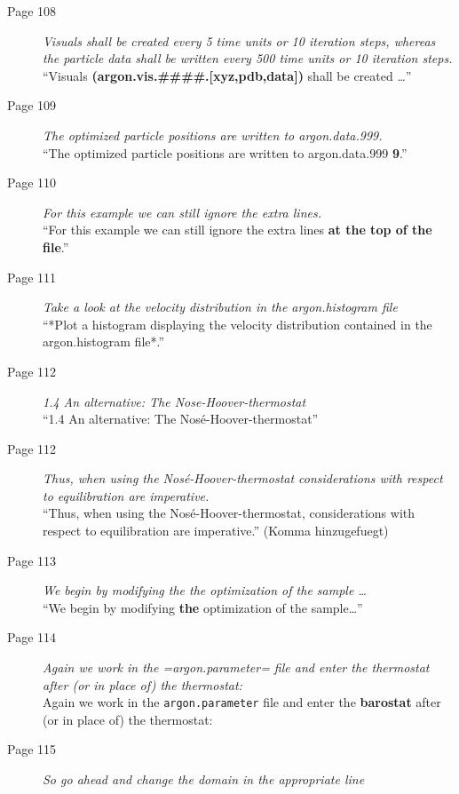 \documentclass[11pt]{article}
\begin{document}
\begin{description}
\item [Page 108] \emph{Visuals shall be created every 5 time units or 10 iteration steps, whereas the particle data shall be written every 500 time units or 10 iteration steps.} \\
                 ``Visuals \textbf{(argon.vis.\##\##.[xyz,pdb,data])} shall be created \ldots{}''
\item [Page 109] \emph{The optimized particle positions are written to argon.data.999.} \\
                 ``The optimized particle positions are written to argon.data.999 \textbf{9}.''
\item [Page 110] \emph{For this example we can still ignore the extra lines.} \\
                  ``For this example we can still ignore the extra lines \textbf{at the top of the file}.''
\item [Page 111] \emph{Take a look at the velocity distribution in the argon.histogram file} \\
                  ``*Plot a histogram displaying the velocity distribution contained in the argon.histogram file*.''
\item [Page 112] \emph{1.4 An alternative: The Nose-Hoover-thermostat} \\
                  ``1.4 An alternative: The Nosé-Hoover-thermostat''
\item [Page 112] \emph{Thus, when using the Nosé-Hoover-thermostat considerations with respect to equilibration are imperative.} \\
                  ``Thus, when using the Nosé-Hoover-thermostat, considerations with respect to equilibration are imperative.'' (Komma hinzugefuegt)
\item [Page 113] \emph{We begin by modifying the the optimization of the sample \ldots{}} \\
                  ``We begin by modifying \textbf{the} optimization of the sample\ldots{}''
\item [Page 114] \emph{Again we work in the =argon.parameter= file and enter the thermostat after (or in place of) the thermostat:} \\
                  Again we work in the \texttt{argon.parameter} file and enter the \textbf{barostat} after (or in place of) the thermostat: \\
\item [Page 115] \emph{So go ahead and change the domain in the appropriate line} \\

\end{description}
\end{document}
